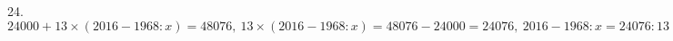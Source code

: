 24. $24000+13\times(2016-1968:x)=48076,\ 13\times(2016-1968:x)=48076-24000=24076,\ 2016-1968:x=24076:13=1852,\ 1968:x=2016-1852=164,\ x=1968:164=12.$\\
